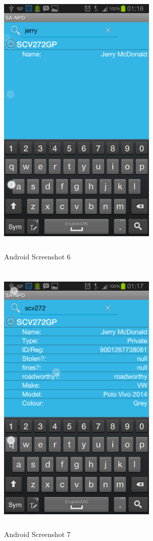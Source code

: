 \documentclass[12pt]{article}
\begin{document}
           				    \begin{figure}[tp]
		                             \centering
		                             \includegraphics[width=3in, height=5.333in]{Pictures/Interface_6.png}
		                             \caption{Android Screenshot 6}
       				   		\end{figure}
			 		   		\begin{figure}[tp]
			                         \centering
			                         \includegraphics[width=3in, height=5.333in]{Pictures/Interface_7.png}
			                         \caption{Android Screenshot 7}
			 	     		\end{figure}                  
                    \FloatBarrier
\end{document}
